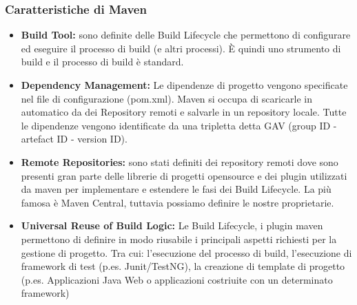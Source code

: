 \documentclass[10pt, a4paper]{article}
\begin{document}
\subsubsection{Caratteristiche di Maven}
\begin{itemize}
    \item \textbf{Build Tool:}  sono definite delle Build Lifecycle che permettono di configurare ed eseguire il processo di build (e altri processi). È quindi uno strumento di build e il processo di build è standard.
    \item \textbf{Dependency Management:}  Le dipendenze di progetto vengono specificate nel file di configurazione (pom.xml). Maven si occupa di scaricarle in automatico da dei Repository remoti e salvarle in un repository locale. Tutte le dipendenze vengono identificate da una tripletta detta GAV (group ID - artefact ID - version ID).
    \item \textbf{Remote Repositories:} sono stati definiti dei repository remoti dove sono presenti gran parte delle librerie di progetti opensource e dei plugin utilizzati da maven per implementare e estendere le fasi dei Build Lifecycle. La più famosa è Maven Central, tuttavia possiamo definire le nostre proprietarie.
    \item \textbf{Universal Reuse of Build Logic:}  Le Build Lifecycle, i plugin maven permettono di definire in modo riusabile i principali aspetti richiesti per la gestione di progetto. Tra cui: l’esecuzione del processo di build, l’esecuzione di framework di test (p.es. Junit/TestNG), la creazione di template di progetto (p.es. Applicazioni Java Web o applicazioni costriuite con un determinato framework)
\end{itemize}
\end{document}
